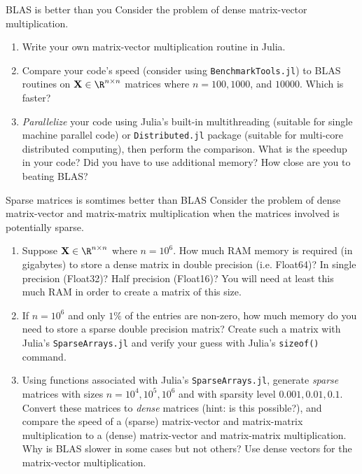 \documentclass[./some_latex_template.tex]{subfiles}
\begin{document}
\begin{problembox}{{BLAS is better than you}}{}
Consider the problem of dense matrix-vector multiplication. 
\begin{enumerate}
	\item Write your own matrix-vector multiplication routine in Julia.
	\item Compare your code's speed (consider using \texttt{BenchmarkTools.jl}) to BLAS routines on $\bX \in \R^{n \times n}$ matrices where $n = 100, 1000$, and $10000$. Which is faster?
	\item \textit{Parallelize} your code using Julia's built-in multithreading (suitable for single machine parallel code) or \texttt{Distributed.jl} package (suitable for multi-core distributed computing), then perform the comparison. What is the speedup in your code? Did you have to use additional memory? How close are you to beating BLAS?
\end{enumerate}
\end{problembox}

\begin{problembox}{Sparse matrices is somtimes better than BLAS}{}
Consider the problem of dense matrix-vector and matrix-matrix multiplication when the matrices involved is potentially sparse. 
\begin{enumerate}
	\item Suppose $\bX \in \R^{n \times n}$ where $n = 10^6$. How much RAM  memory is required (in gigabytes) to store a dense matrix in double precision (i.e. Float64)? In single precision (Float32)? Half precision (Float16)? You will need at least this much RAM in order to create a matrix of this size. 
	\item If $n = 10^6$ and only $1\%$ of the entries are non-zero, how much memory do you need to store a sparse double precision matrix? Create such a matrix with Julia's \texttt{SparseArrays.jl} and verify your guess with Julia's \texttt{sizeof()} command. 
	\item Using functions associated with Julia's \texttt{SparseArrays.jl}, generate \textit{sparse} matrices with sizes $n = 10^4, 10^5, 10^6$ and with sparsity level $0.001, 0.01, 0.1$. Convert these matrices to \textit{dense} matrices (hint: is this possible?), and compare the speed of a (sparse) matrix-vector and matrix-matrix multiplication to a (dense) matrix-vector and matrix-matrix multiplication. Why is BLAS slower in some cases but not others? Use dense vectors for the matrix-vector multiplication. 
\end{enumerate}
\end{problembox}
\end{document}
